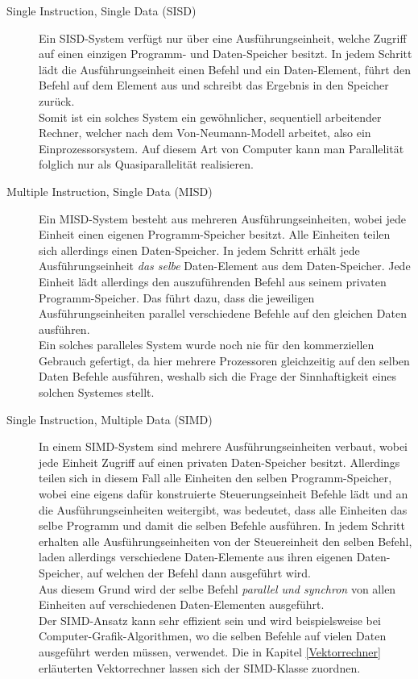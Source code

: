 				\begin{description}
					\item [Single Instruction, Single Data (SISD)]
						Ein SISD-System verfügt nur über eine Ausführungseinheit, welche Zugriff auf einen einzigen Programm- und Daten-Speicher besitzt. In jedem Schritt lädt die Ausführungseinheit einen Befehl und ein Daten-Element, führt den Befehl auf dem Element aus und schreibt das Ergebnis in den Speicher zurück.\\
						Somit ist ein solches System ein gewöhnlicher, sequentiell arbeitender Rechner, welcher nach dem Von-Neumann-Modell arbeitet, also ein Einprozessorsystem. Auf diesem Art von Computer kann man Parallelität folglich nur als Quasiparallelität realisieren.
						
					\item [Multiple Instruction, Single Data (MISD)]
						Ein MISD-System besteht aus mehreren Ausführungseinheiten, wobei jede Einheit einen eigenen Programm-Speicher besitzt. Alle Einheiten teilen sich allerdings einen Daten-Speicher. In jedem Schritt erhält jede Ausführungseinheit \textit{das selbe} Daten-Element aus dem Daten-Speicher. Jede Einheit lädt allerdings den auszuführenden Befehl aus seinem privaten Programm-Speicher. Das führt dazu, dass die jeweiligen Ausführungseinheiten parallel verschiedene Befehle auf den gleichen Daten ausführen.\\
						Ein solches paralleles System wurde noch nie für den kommerziellen Gebrauch gefertigt, da hier mehrere Prozessoren gleichzeitig auf den selben Daten Befehle ausführen, weshalb sich die Frage der Sinnhaftigkeit eines solchen Systemes stellt.
					
					\item [Single Instruction, Multiple Data (SIMD)]
						In einem SIMD-System sind mehrere Ausführungseinheiten verbaut, wobei jede Einheit Zugriff auf einen privaten Daten-Speicher besitzt. Allerdings teilen sich in diesem Fall alle Einheiten den selben Programm-Speicher, wobei eine eigens dafür konstruierte Steuerungseinheit Befehle lädt und an die Ausführungseinheiten weitergibt, was bedeutet, dass alle Einheiten das selbe Programm und damit die selben Befehle ausführen. In jedem Schritt erhalten alle Ausführungseinheiten von der Steuereinheit den selben Befehl, laden allerdings verschiedene Daten-Elemente aus ihren eigenen Daten-Speicher, auf welchen der Befehl dann ausgeführt wird.\\
						Aus diesem Grund wird der selbe Befehl \textit{parallel und synchron} von allen Einheiten auf verschiedenen Daten-Elementen ausgeführt.\\
						Der SIMD-Ansatz kann sehr effizient sein und wird beispielsweise bei Computer-Grafik-Algorithmen, wo die selben Befehle auf vielen Daten ausgeführt werden müssen, verwendet. Die in Kapitel \ref{Vektorrechner} erläuterten Vektorrechner lassen sich der SIMD-Klasse zuordnen.
						

\end{description}
